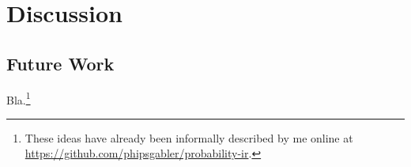 \chapter{Discussion}
\label{cha:discussion}

\section{Future Work}
\label{sec:future-work}

Bla.\footnote{These ideas have already been informally described by me online at
  \protect\url{https://github.com/phipsgabler/probability-ir}.}




